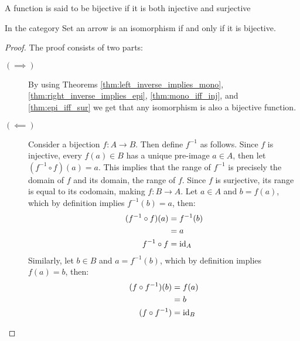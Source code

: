\begin{definition}

  A function is said to be bijective if it is both injective and surjective
\end{definition}

\begin{theorem}
  In the category Set an arrow is an isomorphism if and only if it is
  bijective.

  \begin{proof}
    The proof consists of two parts:

    \begin{description}
      \item[$(\implies)$] By using Theorems
        \ref{thm:left_inverse_implies_mono},
        \ref{thm:right_inverse_implies_epi}, \ref{thm:mono_iff_inj}, and
        \ref{thm:epi_iff_sur} we get that any isomorphism is also a bijective
        function.
      \item[$(\impliedby)$] Consider a bijection $f:A\to B$. Then define
        $f^{-1}$ as follows. Since $f$ is injective, every $f(a)\in B$ has a
        unique pre-image $a\in A$, then let $(f^{-1}\circ f)(a) = a$. This
        implies that the range of $f^{-1}$ is precisely the domain of $f$ and
        its domain, the range of $f$. Since $f$ is surjective, its range is
        equal to its codomain, making $f:B\to A$. Let $a\in A$ and $b=f(a)$,
        which by definition implies $f^{-1}(b)=a$, then:
        \[
          \begin{aligned}
            (f^{-1}\circ f)(a)
            &= f^{-1}(b)\\
            &= a\\
            f^{-1}\circ f &= \mathrm{id}_A
          \end{aligned}
        \]
        Similarly, let $b\in B$ and $a=f^{-1}(b)$, which by definition implies
        $f(a)=b$, then:
        \[
          \begin{aligned}
            (f\circ f^{-1})(b)
            &= f(a)\\
            &= b\\
            (f\circ f^{-1}) &= \mathrm{id}_B
          \end{aligned}
        \]
    \end{description}
  \end{proof}
\end{theorem}